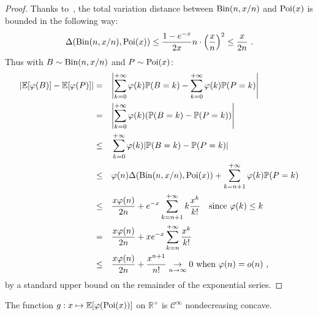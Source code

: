 \begin{proof}
  Thanks to~\cite{Barbour84, TF19}, the total variation distance between $\operatorname{\text{Bin}}(n,x/n)$ and $\operatorname{\text{Poi}}(x)$ is bounded in the following way:
  \[ \Delta(\Bin(n,x/n),\Poi(x)) \leq \frac{1 - e^{-x}}{2x} n \cdot \left(\frac{x}{n}\right)^2 \leq \frac{x}{2n}\ .\]
  Thus with $B \sim \operatorname{\text{Bin}}(n,x/n)$ and $P \sim \operatorname{\text{Poi}}(x)$:
  \begin{equation}
    \begin{aligned}
      \abs{\mathbb{E}[\varphi(B)] - \mathbb{E}[\varphi(P)]} &=&&  \abs{\sum_{k=0}^{+\infty}\varphi(k)\mathbb{P}(B=k) - \sum_{k=0}^{+\infty}\varphi(k)\mathbb{P}(P=k)}\\
      &=&&  \abs{\sum_{k=0}^{+\infty}\varphi(k)(\mathbb{P}(B=k) - \mathbb{P}(P=k))}\\
      &\leq&& \sum_{k=0}^{+\infty}\varphi(k)\abs{\mathbb{P}(B=k) - \mathbb{P}(P=k)}\\
      &\leq&& \varphi(n)\Delta(\operatorname{\text{Bin}}(n,x/n),\operatorname{\text{Poi}}(x)) + \sum_{k=n+1}^{+\infty}\varphi(k)\mathbb{P}(P=k)\\
      &\leq&&\frac{x \varphi(n)}{2n}  + e^{-x}\sum_{k=n+1}^{+\infty}k\frac{x^k}{k!} \quad \text{since } \varphi(k) \leq k\\
      &=&& \frac{x \varphi(n)}{2n}  + xe^{-x}\sum_{k=n}^{+\infty}\frac{x^k}{k!}\\
      &\leq&& \frac{x \varphi(n)}{2n}  + \frac{x^{n+1}}{n!} \underset{n \rightarrow \infty}{\rightarrow} 0 \text{ when } \varphi(n) = o(n)\ ,
    \end{aligned}
  \end{equation}
  by a standard upper bound on the remainder of the exponential series.

\end{proof}

\begin{proposition}
  The function $g : x \mapsto \mathbb{E}[\varphi(\operatorname{\text{Poi}}(x))]$ on $\mathbb{R}^+$ is $\mathcal{C}^{\infty}$ nondecreasing concave.
  \label{prop:PoiCon}
\end{proposition}

